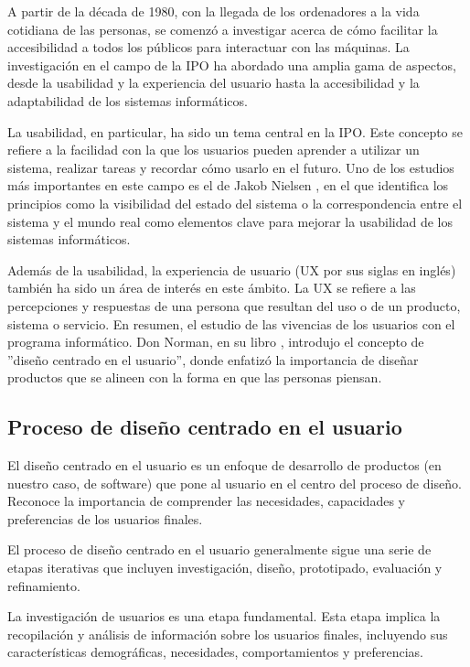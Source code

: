 A partir de la década de 1980, con la llegada de los ordenadores a la vida cotidiana de las personas, se comenzó a investigar acerca de cómo facilitar la accesibilidad a todos los públicos para interactuar con las máquinas.  La investigación en el campo de la IPO ha abordado una amplia gama de aspectos, desde la usabilidad y la experiencia del usuario hasta la accesibilidad y la adaptabilidad de los sistemas informáticos.

La usabilidad, en particular, ha sido un tema central en la IPO. Este concepto se refiere a la facilidad con la que los usuarios pueden aprender a utilizar un sistema, realizar tareas y recordar cómo usarlo en el futuro. Uno de los estudios más importantes en este campo es el de Jakob Nielsen \cite{nielsen1994usability}, en el que identifica los principios como la visibilidad del estado del sistema o la correspondencia entre el sistema y el mundo real como elementos clave para mejorar la usabilidad de los sistemas informáticos.

Además de la usabilidad, la experiencia de usuario (UX por sus siglas en inglés) también ha sido un área de interés en este ámbito. La UX se refiere a las percepciones y respuestas de una persona que resultan del uso o de un producto, sistema o servicio. En resumen, el estudio de las vivencias de los usuarios con el programa informático. Don Norman, en su libro \cite{norman2013design}, introdujo el concepto de ''diseño centrado en el usuario'', donde enfatizó la importancia de diseñar productos que se alineen con la forma en que las personas piensan.

\subsection{Proceso de diseño centrado en el usuario}

El diseño centrado en el usuario es un enfoque de desarrollo de productos (en nuestro caso, de software) que pone al usuario en el centro del proceso de diseño. Reconoce la importancia de comprender las necesidades, capacidades y preferencias de los usuarios finales.

El proceso de diseño centrado en el usuario generalmente sigue una serie de etapas iterativas que incluyen investigación, diseño, prototipado, evaluación y refinamiento.

La investigación de usuarios es una etapa fundamental. Esta etapa implica la recopilación y análisis de información sobre los usuarios finales, incluyendo sus características demográficas, necesidades, comportamientos y preferencias.

